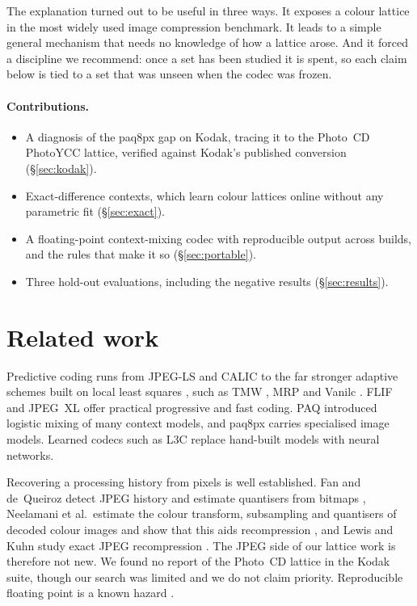 \documentclass[10pt,twocolumn]{article}
\begin{document}
The explanation turned out to be useful in three ways. It exposes a colour lattice in the most widely used image compression benchmark. It leads to a simple general mechanism that needs no knowledge of how a lattice arose. And it forced a discipline we recommend: once a set has been studied it is spent, so each claim below is tied to a set that was unseen when the codec was frozen.

\paragraph{Contributions.}
\begin{itemize}\setlength\itemsep{1pt}\setlength\parskip{0pt}
\item A diagnosis of the paq8px gap on Kodak, tracing it to the Photo~CD PhotoYCC lattice, verified against Kodak's published conversion (\S\ref{sec:kodak}).
\item Exact-difference contexts, which learn colour lattices online without any parametric fit (\S\ref{sec:exact}).
\item A floating-point context-mixing codec with reproducible output across builds, and the rules that make it so (\S\ref{sec:portable}).
\item Three hold-out evaluations, including the negative results (\S\ref{sec:results}).
\end{itemize}

\section{Related work}

Predictive coding runs from JPEG-LS \cite{jpegls} and CALIC \cite{calic} to the far stronger adaptive schemes built on local least squares \cite{edp}, such as TMW \cite{tmw}, MRP \cite{mrp} and Vanilc \cite{vanilc}. FLIF \cite{flif} and JPEG~XL \cite{jpegxl} offer practical progressive and fast coding. PAQ \cite{mahoney} introduced logistic mixing of many context models, and paq8px \cite{paq8px} carries specialised image models. Learned codecs such as L3C \cite{l3c} replace hand-built models with neural networks.

Recovering a processing history from pixels is well established. Fan and de~Queiroz detect JPEG history and estimate quantisers from bitmaps \cite{fan}, Neelamani et al.\ estimate the colour transform, subsampling and quantisers of decoded colour images and show that this aids recompression \cite{neelamani}, and Lewis and Kuhn study exact JPEG recompression \cite{lewis}. The JPEG side of our lattice work is therefore not new. We found no report of the Photo~CD lattice in the Kodak suite, though our search was limited and we do not claim priority. Reproducible floating point is a known hazard \cite{monniaux,ieee}.
\end{document}
